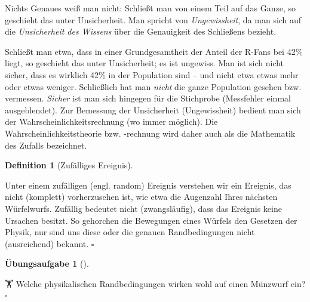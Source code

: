 \documentclass[
  ngerman,
  letterpaper,
  twoside,
  open=any]{scrbook}
\theoremstyle{definition}
\theoremstyle{plain}
\theoremstyle{definition}
\newtheorem{exercise}{Übungsaufgabe}[chapter]
\theoremstyle{definition}
\newtheorem{definition}{Definition}[chapter]
\theoremstyle{remark}
\begin{document}
\begin{tcolorbox}[enhanced jigsaw, arc=.35mm, bottomrule=.15mm, bottomtitle=1mm, breakable, colback=white, colbacktitle=quarto-callout-important-color!10!white, colframe=quarto-callout-important-color-frame, coltitle=black, left=2mm, leftrule=.75mm, opacityback=0, opacitybacktitle=0.6, rightrule=.15mm, title=\textcolor{quarto-callout-important-color}{\faExclamation}\hspace{0.5em}{Wichtig}, titlerule=0mm, toprule=.15mm, toptitle=1mm]

Nichts Genaues weiß man nicht: Schließt man von einem Teil auf das
Ganze, so geschieht das unter Unsicherheit. Man spricht von
\emph{Ungewissheit}, da man sich auf die \emph{Unsicherheit des Wissens}
über die Genauigkeit des Schließens bezieht.

\end{tcolorbox}

Schließt man etwa, dass in einer Grundgesamtheit der Anteil der R-Fans
bei 42\% liegt, so geschieht das unter Unsicherheit; es ist ungewiss.
Man ist sich nicht sicher, dass es wirklich 42\% in der Population sind
-- und nicht etwa etwas mehr oder etwas weniger. Schließlich hat man
\emph{nicht} die ganze Population gesehen bzw. vermessen. \emph{Sicher}
ist man sich hingegen für die Stichprobe (Messfehler einmal
ausgeblendet). Zur Bemessung der Unsicherheit (Ungewissheit) bedient man
sich der Wahrscheinlichkeitsrechnung (wo immer möglich). Die
Wahrscheinlichkeitstheorie bzw. -rechnung wird daher auch als die
Mathematik des Zufalls bezeichnet.

\begin{definition}[Zufälliges
Ereignis]\protect\hypertarget{def-zufall}{}\label{def-zufall}

Unter einem zufälligen (engl. random) Ereignis verstehen wir ein
Ereignis, das nicht (komplett) vorherzusehen ist, wie etwa die Augenzahl
Ihres nächsten Würfelwurfs. Zufällig bedeutet nicht (zwangsläufig), dass
das Ereignis keine Ursachen besitzt. So gehorchen die Bewegungen eines
Würfels den Gesetzen der Physik, nur sind uns diese oder die genauen
Randbedingungen nicht (ausreichend) bekannt. \(\square\)

\end{definition}

\begin{exercise}[]\protect\hypertarget{exr-muenz}{}\label{exr-muenz}

🏋 Welche physikalischen Randbedingungen wirken wohl auf einen Münzwurf
ein? \(\square\)

\end{exercise}
\end{document}
